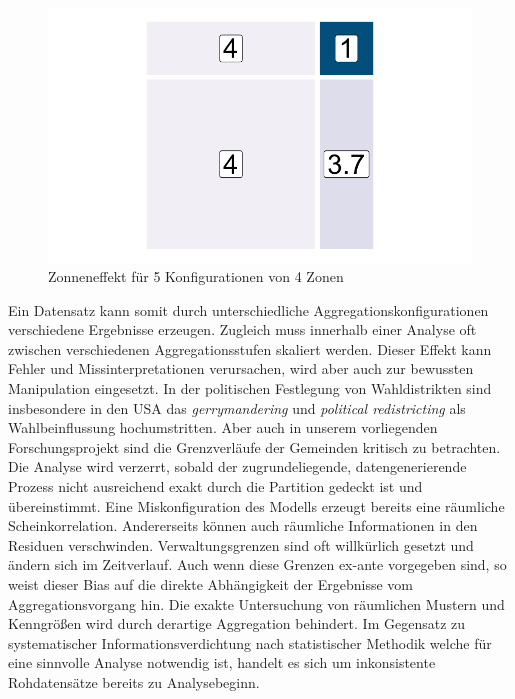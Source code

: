 \begin{figure}[htb]
\begin{minipage}[b]{.32\linewidth}
    \end{minipage}
    \hfill
    \begin{minipage}[b]{.32\linewidth}
       \includegraphics[width=\linewidth,trim={0.5cm 0.5cm 0.5cm 0.5cm},clip]{body/figures/49-zon_f.pdf}
    \end{minipage}
    \caption[Zoneneffekt]{Zonneneffekt für 5 Konfigurationen von 4 Zonen }
    \label{fig_zoning3}
 \end{figure}

Ein Datensatz kann somit durch unterschiedliche Aggregationskonfigurationen verschiedene Ergebnisse erzeugen. 
Zugleich muss innerhalb einer Analyse oft zwischen verschiedenen Aggregationsstufen skaliert werden.
Dieser Effekt kann Fehler und Missinterpretationen verursachen, wird aber auch zur bewussten Manipulation eingesetzt. 
In der politischen Festlegung von Wahldistrikten sind insbesondere in den USA das \emph{gerrymandering} und \emph{political redistricting} als Wahlbeinflussung hochumstritten.
Aber auch in unserem vorliegenden Forschungsprojekt sind die Grenzverläufe der Gemeinden kritisch zu betrachten. Die Analyse wird verzerrt, sobald der zugrundeliegende, datengenerierende
Prozess nicht ausreichend exakt durch die Partition gedeckt ist und übereinstimmt. 
Eine Miskonfiguration des Modells erzeugt bereits eine räumliche Scheinkorrelation. 
Andererseits können auch räumliche Informationen in den Residuen verschwinden.
Verwaltungsgrenzen sind oft willkürlich gesetzt und ändern sich im Zeitverlauf. %
Auch wenn diese Grenzen ex-ante vorgegeben sind, so weist dieser Bias auf die direkte Abhängigkeit der Ergebnisse vom Aggregationsvorgang hin. 
Die exakte Untersuchung von räumlichen Mustern und Kenngrößen wird durch derartige Aggregation behindert. 
Im Gegensatz zu systematischer Informationsverdichtung nach 
statistischer Methodik welche für eine sinnvolle Analyse notwendig ist, 
handelt es sich um inkonsistente Rohdatensätze bereits zu Analysebeginn. \\

